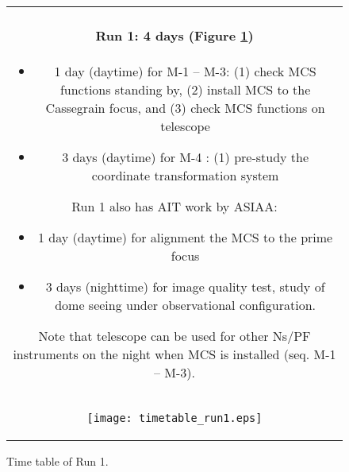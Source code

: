 \begin{figure}[!ht]
\begin{center}
\begin{tabular}{c}
\begin{minipage}{0.95\hsize}
\paragraph{Run 1: 4 days (Figure \ref{fig:run1})}
	\begin{itemize}
 	\item 1 day (daytime) for M-1 --  M-3: 
	(1) check MCS functions standing by,
	(2) install MCS to the Cassegrain focus, and
	(3) check MCS functions on telescope
 	\item 3 days (daytime) for M-4 : 
	(1) pre-study the coordinate transformation system
	\end{itemize}
Run 1 also has AIT work by ASIAA:
	\begin{itemize}
 	\item 1 day (daytime) for alignment the MCS to the prime focus
 	\item 3 days (nighttime) for image quality test, study of dome seeing under observational configuration.
	\end{itemize}
Note that telescope can be used for other Ns/PF instruments on the night when MCS is installed (seq. M-1 -- M-3).
\end{minipage} \\
\begin{minipage}{0.8\hsize}
	\begin{center}
	\vspace*{5mm}
	\texttt{[image: timetable\_run1.eps]}
	\end{center}
	\vspace*{-5mm}
	\caption{Time table of Run 1.}
	\label{fig:run1}
\end{minipage}
\end{tabular}
\end{center}
\end{figure}

